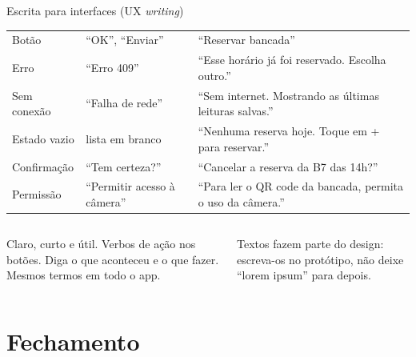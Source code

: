 \documentclass[aspectratio=169,10pt]{beamer}
\begin{document}
\begin{frame}{Escrita para interfaces (UX \emph{writing})}
  \footnotesize
  \begin{tabularx}{\textwidth}{@{}p{2.6cm} L L@{}}
    \toprule
     &  &  \\
    \midrule
    Botão & ``OK'', ``Enviar'' & ``Reservar bancada'' \\
    Erro & ``Erro 409'' & ``Esse horário já foi reservado. Escolha outro.'' \\
    Sem conexão & ``Falha de rede'' & ``Sem internet. Mostrando as últimas leituras salvas.'' \\
    Estado vazio & lista em branco & ``Nenhuma reserva hoje. Toque em + para reservar.'' \\
    Confirmação & ``Tem certeza?'' & ``Cancelar a reserva da B7 das 14h?'' \\
    Permissão & ``Permitir acesso à câmera'' & ``Para ler o QR code da bancada, permita o uso da câmera.'' \\
    \bottomrule
  \end{tabularx}
  \vspace{4pt}
  \begin{columns}[T]
    \begin{column}{0.48\textwidth}
      \begin{conceito}[Princípios]
        Claro, curto e útil. Verbos de ação nos botões. Diga o que aconteceu e o que fazer. Mesmos termos em todo o app.
      \end{conceito}
    \end{column}
    \begin{column}{0.48\textwidth}
      \begin{dica}
        Textos fazem parte do design: escreva-os no protótipo, não deixe ``lorem ipsum'' para depois.
      \end{dica}
    \end{column}
  \end{columns}
\end{frame}

\section{Fechamento}
\end{document}

